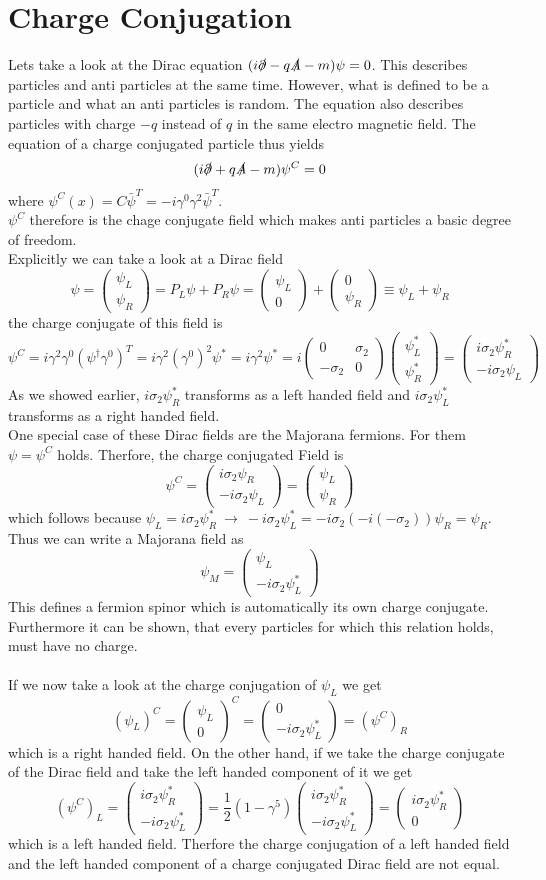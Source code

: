\documentclass{include/thesisclass}
\newcommand{\df}{\rightarrow}
\newcommand{\p}{\partial}
\newcommand{\vektorz}[2]{\begin{pmatrix} #1 \\ #2 \end{pmatrix}}
\newcommand{\Matz}[4]{\begin{pmatrix}#1&#2\\#3&#4\end{pmatrix}}
\begin{document}
\section{Charge Conjugation}
Lets take a look at the Dirac equation $(i \slashed{\p} - q \slashed{A} -m ) \psi = 0$. This describes particles and anti particles at the same time. However, what is defined to be a particle and what an anti particles is random. The equation also describes particles with charge $-q$ instead of $q$ in the same electro magnetic field. The equation of a charge conjugated particle thus yields
\[ ( i \slashed{\p} + q \slashed{A} - m) \psi^C = 0\]
where $\psi^C(x) = C \bar{\psi}^T = - i \gamma^0 \gamma^2 \bar{\psi}^T$.\\
$\psi^C$ therefore is the chage conjugate field which makes anti particles a basic degree of freedom.\\
Explicitly we can take a look at a Dirac field
\[ \psi = \vektorz{\psi_L}{\psi_R} = P_L \psi + P_R\psi = \vektorz{\psi_L}{0} + \vektorz{0}{\psi_R} \equiv \psi_L + \psi_R\]
the charge conjugate of this field is
\[ \psi^C = i \gamma^2 \gamma^0 ( \psi^\dagger \gamma^0 )^T = i \gamma^2 (\gamma^0)^2 \psi^* = i \gamma^2 \psi^* = i \Matz{0}{\sigma_2}{-\sigma_2}{0} \vektorz{\psi_L^*}{\psi_R^*} = \vektorz{i \sigma_2 \psi_R^*}{-i\sigma_2\psi_L}\]
As we showed earlier, $i \sigma_2 \psi_R^*$ transforms as a left handed field and $i \sigma_2 \psi_L^*$ transforms as a right handed field.\\
One special case of these Dirac fields are the Majorana fermions. For them $\psi = \psi^C$ holds. Therfore, the charge conjugated Field is
\[ \psi^C = \vektorz{i \sigma_2 \psi_R}{-i \sigma_2 \psi_L} = \vektorz{\psi_L}{\psi_R}\]
which follows because $\psi_L = i \sigma_2 \psi_R^* ~\df~ -i \sigma_2 \psi_L^* = -i \sigma_2( -i(-\sigma_2)) \psi_R = \psi_R$. Thus we can write a Majorana field as
\[ \psi_M = \vektorz{\psi_L}{-i \sigma_2 \psi_L^*}\]
This defines a fermion spinor which is automatically its own charge conjugate. Furthermore it can be shown, that every particles for which this relation holds, must have no charge.\\
\\
If we now take a look at the charge conjugation of $\psi_L$ we get
\[ (\psi_L)^C = \vektorz{\psi_L}{0}^C = \vektorz{ 0}{-i \sigma_2 \psi_L^*} = (\psi^C)_R\]
which is a right handed field. On the other hand, if we take the charge conjugate of the Dirac field and take the left handed component of it we get
\[ (\psi^C)_L = \vektorz{ i \sigma_2 \psi_R^*}{-i \sigma_2 \psi_L^*} = \frac{1}{2} ( 1 - \gamma^5) \vektorz{ i \sigma_2 \psi_R^* }{-i \sigma_2 \psi_L^*} = \vektorz{ i \sigma_2 \psi_R^*}{0} \]
which is a left handed field. Therfore the charge conjugation of a left handed field and the left handed component of a charge conjugated Dirac field are not equal.
\end{document}
